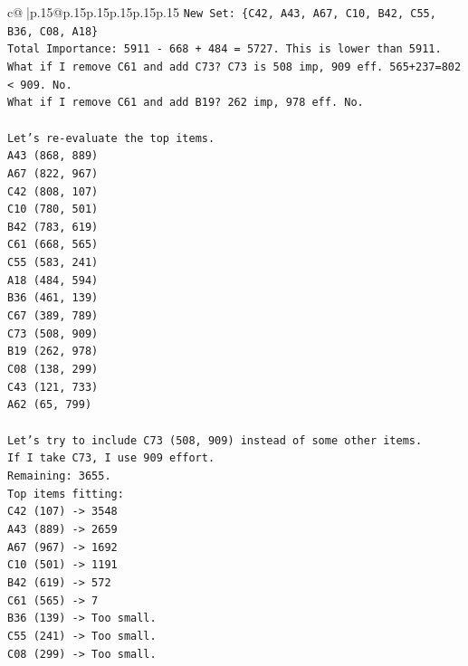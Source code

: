 \documentclass{article}
\begin{document}
{\begin{supertabular}{c@{$\;$}|p{.15\linewidth}@{}p{.15\linewidth}p{.15\linewidth}p{.15\linewidth}p{.15\linewidth}p{.15\linewidth}}
{{{\texttt{New Set: \{C42, A43, A67, C10, B42, C55, B36, C08, A18\}} \\
\texttt{Total Importance: 5911 {-} 668 + 484 = 5727. This is lower than 5911.} \\
\texttt{What if I remove C61 and add C73? C73 is 508 imp, 909 eff. 565+237=802 < 909. No.} \\
\texttt{What if I remove C61 and add B19? 262 imp, 978 eff. No.} \\
\\ 
\texttt{Let's re{-}evaluate the top items.} \\
\texttt{A43 (868, 889)} \\
\texttt{A67 (822, 967)} \\
\texttt{C42 (808, 107)} \\
\texttt{C10 (780, 501)} \\
\texttt{B42 (783, 619)} \\
\texttt{C61 (668, 565)} \\
\texttt{C55 (583, 241)} \\
\texttt{A18 (484, 594)} \\
\texttt{B36 (461, 139)} \\
\texttt{C67 (389, 789)} \\
\texttt{C73 (508, 909)} \\
\texttt{B19 (262, 978)} \\
\texttt{C08 (138, 299)} \\
\texttt{C43 (121, 733)} \\
\texttt{A62 (65, 799)} \\
\\ 
\texttt{Let's try to include C73 (508, 909) instead of some other items.} \\
\texttt{If I take C73, I use 909 effort.} \\
\texttt{Remaining: 3655.} \\
\texttt{Top items fitting:} \\
\texttt{C42 (107) {-}> 3548} \\
\texttt{A43 (889) {-}> 2659} \\
\texttt{A67 (967) {-}> 1692} \\
\texttt{C10 (501) {-}> 1191} \\
\texttt{B42 (619) {-}> 572} \\
\texttt{C61 (565) {-}> 7} \\
\texttt{B36 (139) {-}> Too small.} \\
\texttt{C55 (241) {-}> Too small.} \\
\texttt{C08 (299) {-}> Too small.} \\
}}}
\end{supertabular}}
\end{document}
